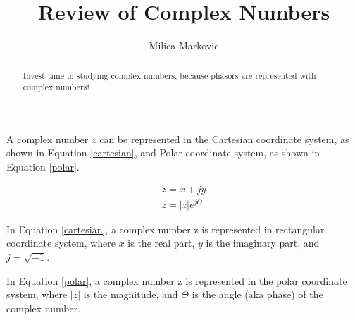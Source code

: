 \documentclass{ximera}
\title{Review of Complex Numbers}
\author{Milica Markovic}
\begin{document}
  
\begin{abstract}  
Invest time in studying complex numbers, because phasors are represented with complex numbers!
\end{abstract}  
\maketitle    
  
  \begin{definition}
 A complex number  $z$ can be represented in the Cartesian coordinate system, as shown in Equation \ref{cartesian}, and  Polar coordinate system, as shown in Equation \ref{polar}. 




\begin{eqnarray}
z= x + j y \label{cartesian} \\ 
z=|z| e^{j \Theta} \label{polar}
\end{eqnarray}

\end{definition}

In Equation \ref{cartesian}, a complex number z is represented in rectangular coordinate system, where $x$ is the real part, $y$ is the imaginary part, and $j=\sqrt{-1}$. 

In Equation \ref{polar}, a complex number z is represented in the polar coordinate system, where  $|z|$ is the magnitude, and $\Theta$ is the angle (aka phase) of the complex number.
\end{document}
